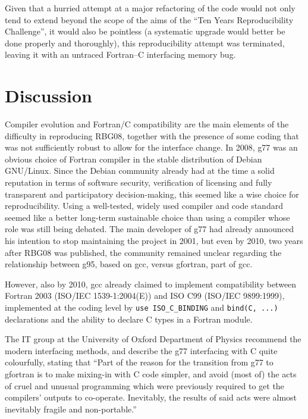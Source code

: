 Given that a hurried attempt at a major refactoring of the code would
not only tend to extend beyond the scope of the aims of the ``Ten
Years Reproducibility Challenge'', it would also be pointless (a
systematic upgrade would better be done properly and thoroughly),
this reproducibility attempt was terminated, leaving it with
an untraced Fortran--C interfacing memory bug.
\sloppy

\section{Discussion}

Compiler evolution and Fortran/C compatibility are the main elements of
the difficulty in reproducing RBG08, together with the presence of some coding
that was not sufficiently robust to allow for the interface change.
In 2008, {\sc g77} was an obvious
choice of Fortran compiler in the stable distribution of Debian
GNU/Linux. Since the Debian community already had at the time a solid
reputation in terms of software security, verification of licensing
and fully transparent and participatory decision-making, this seemed
like a wise choice for reproducibility. Using a well-tested, widely used
compiler and code standard seemed like a better long-term sustainable choice
than using a compiler whose role was still being debated.
The main developer of {\sc g77} had already announced his intention to stop maintaining the
project in 2001\supercite{Burley01g77}, but even by 2010, two years
after RBG08 was published, the community remained unclear regarding
the relationship between {\sc g95}, based on {\sc gcc}, versus
{\sc gfortran}, part of {\sc gcc}\supercite{Bosscher10g95}.

However, also by 2010, {\sc gcc} already claimed to implement
compatibility between Fortran 2003 (ISO/IEC 1539-1:2004(E)) and ISO
C99 (ISO/IEC 9899:1999)\supercite{GCCISOFortranC}, implemented at the
coding level by {\tt use ISO\_C\_BINDING} and {\tt bind(C, ...)}
declarations and the ability to declare C types in a Fortran module.

The IT group at the University of Oxford Department of Physics
recommend the modern interfacing methods, and describe
the {\sc g77} interfacing with C quite colourfully, stating that
``Part of the reason for the transition from g77 to gfortran is to
make mixing-in with C code simpler, and avoid (most of) the acts of
cruel and unusual programming which were previously required to get
the compilers' outputs to co-operate. Inevitably, the results of said
acts were almost inevitably fragile and non-portable.''\supercite{Oxfordg77goneto}

